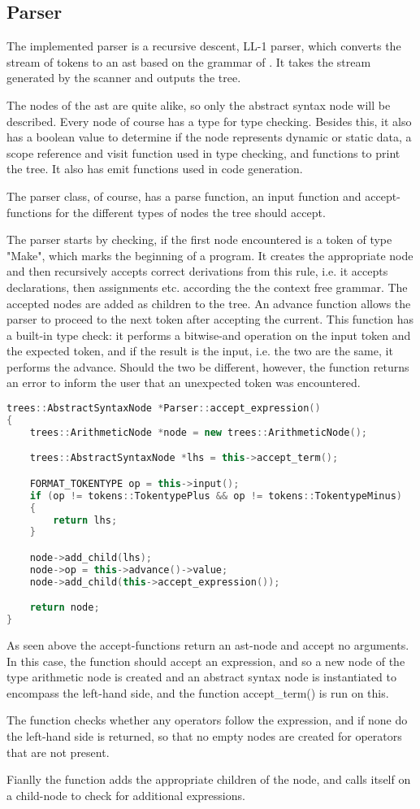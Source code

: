 \subsection{Parser}
The implemented parser is a recursive descent, LL-1 parser, which converts the stream of tokens to an \ac{ast} based on the grammar of \langname{}. It takes the stream generated by the scanner and outputs the tree.

The nodes of the \ac{ast} are quite alike, so only the abstract syntax node will be described. Every node of course has a type for type checking. Besides this, it also has a boolean value to determine if the node represents dynamic or static data, a scope reference and visit function used in type checking, and functions to print the tree. It also has emit functions used in code generation.
 
The parser class, of course, has a parse function, an input function and accept-functions for the different types of nodes the tree should accept.

The parser starts by checking, if the first node encountered is a token of type "Make", which marks the beginning of a program. It creates the appropriate node and then recursively accepts correct derivations from this rule, i.e. it accepts declarations, then assignments etc. according the the context free grammar. The accepted nodes are added as children to the tree. An advance function allows the parser to proceed to the next token after accepting the current. This function has a built-in type check: it performs a bitwise-and operation on the input token and the expected token, and if the result is the input, i.e. the two are the same, it performs the advance. Should the two be different, however, the function returns an error to inform the user that an unexpected token was encountered.

\begin{lstlisting}[language = c++]
trees::AbstractSyntaxNode *Parser::accept_expression()
{
	trees::ArithmeticNode *node = new trees::ArithmeticNode();

	trees::AbstractSyntaxNode *lhs = this->accept_term();

	FORMAT_TOKENTYPE op = this->input();
	if (op != tokens::TokentypePlus && op != tokens::TokentypeMinus)
	{
		return lhs;
	}

	node->add_child(lhs);
	node->op = this->advance()->value;
	node->add_child(this->accept_expression());

	return node;
}
\end{lstlisting}

As seen above the accept-functions return an \ac{ast}-node and accept no arguments. In this case, the function should accept an expression, and so a new node of the type arithmetic node is created and an abstract syntax node is instantiated to encompass the left-hand side, and the function accept\_term() is run on this. 

The function checks whether any operators follow the expression, and if none do the left-hand side is returned, so that no empty nodes are created for operators that are not present.

Fianlly the function adds the appropriate children of the node, and calls itself on a child-node to check for additional expressions.
